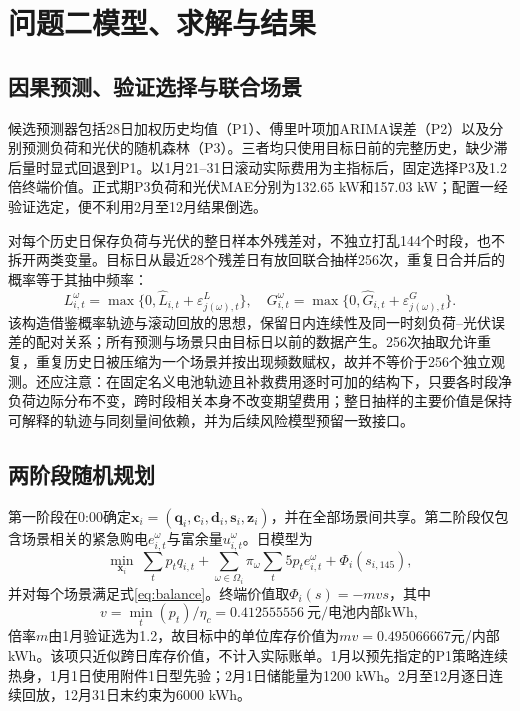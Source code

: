 \section{问题二模型、求解与结果}

\subsection{因果预测、验证选择与联合场景}

候选预测器包括28日加权历史均值（P1）、傅里叶项加ARIMA误差（P2）以及分别预测负荷和光伏的随机森林（P3）。三者均只使用目标日前的完整历史，缺少滞后量时显式回退到P1。以1月21--31日滚动实际费用为主指标后，固定选择P3及1.2倍终端价值。正式期P3负荷和光伏MAE分别为132.65 kW和157.03 kW；配置一经验证选定，便不利用2月至12月结果倒选。

对每个历史日保存负荷与光伏的整日样本外残差对，不独立打乱144个时段，也不拆开两类变量。目标日从最近28个残差日有放回联合抽样256次，重复日合并后的概率等于其抽中频率：
\begin{equation}
 L_{i,t}^{\omega}=\max\{0,\widehat L_{i,t}+\varepsilon_{j(\omega),t}^{L}\},\quad
 G_{i,t}^{\omega}=\max\{0,\widehat G_{i,t}+\varepsilon_{j(\omega),t}^{G}\}.
\end{equation}
该构造借鉴概率轨迹与滚动回放的思想\cite{lemos2022}，保留日内连续性及同一时刻负荷--光伏误差的配对关系；所有预测与场景只由目标日以前的数据产生。256次抽取允许重复，重复历史日被压缩为一个场景并按出现频数赋权，故并不等价于256个独立观测。还应注意：在固定名义电池轨迹且补救费用逐时可加的结构下，只要各时段净负荷边际分布不变，跨时段相关本身不改变期望费用；整日抽样的主要价值是保持可解释的轨迹与同刻量间依赖，并为后续风险模型预留一致接口。

\subsection{两阶段随机规划}

第一阶段在0:00确定$\bm x_i=(\bm q_i,\bm c_i,\bm d_i,\bm s_i,\bm z_i)$，并在全部场景间共享。第二阶段仅包含场景相关的紧急购电$e_{i,t}^{\omega}$与富余量$u_{i,t}^{\omega}$。日模型为
\begin{equation}
\min_{\bm x_i}\ \sum_t p_tq_{i,t}
+\sum_{\omega\in\Omega_i}\pi_\omega\sum_t5p_te_{i,t}^{\omega}
+\Phi_i(s_{i,145}),
\label{eq:q2obj}
\end{equation}
并对每个场景满足式\eqref{eq:balance}。终端价值取$\Phi_i(s)=-mvs$，其中
\begin{equation}
v=\min_t(p_t)/\eta_c=0.412555556\ \text{元/电池内部kWh},
\end{equation}
倍率$m$由1月验证选为1.2，故目标中的单位库存价值为$mv=0.495066667$元/内部kWh。该项只近似跨日库存价值，不计入实际账单。1月以预先指定的P1策略连续热身，1月1日使用附件1日型先验；2月1日储能量为1200 kWh。2月至12月逐日连续回放，12月31日末约束为6000 kWh。

